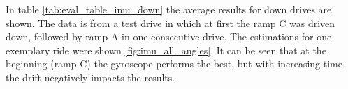 In table \cref{tab:eval_table_imu_down} the average results for down drives are shown.
The data is from a test drive in which at first the ramp C was driven down, followed by ramp A in one consecutive drive.
The estimations for one exemplary ride were shown \cref{fig:imu_all_angles}.
It can be seen that at the beginning (ramp C) the gyroscope performs the best, but with increasing time the drift negatively impacts the results.
\begin{table}[htb]
	\centering
	\caption{Performance measures down ZED \gls{imu}}
	\label{tab:eval_table_imu_down}
\end{table}


